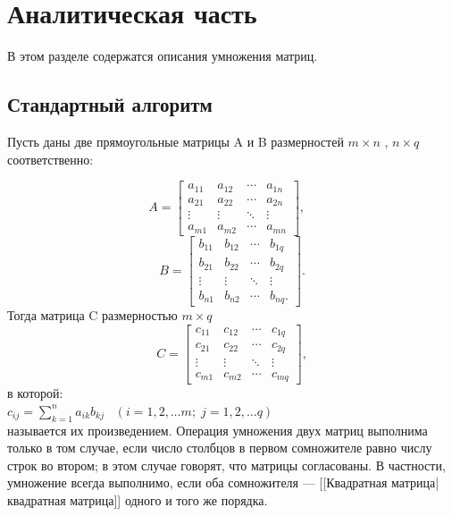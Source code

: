 \documentclass[a4paper,12pt]{report}
\begin{document}
\chapter{Аналитическая часть}
\hspace{0.6cm}В этом разделе содержатся описания умножения матриц.

\section{Стандартный алгоритм}
\hspace{0.6cm}Пусть даны две прямоугольные матрицы A и B размерностей $m \times n$ , $n \times q$ соответственно:

\[
A = 
  \begin{bmatrix} 
    a_{11} & a_{12} & \cdots & a_{1n} \\
    a_{21} & a_{22} & \cdots & a_{2n} \\ 
    \vdots & \vdots & \ddots & \vdots \\ 
    a_{m1} & a_{m2} & \cdots & a_{mn}
  \end{bmatrix},\;\;\;
\]
\[
B =   
  \begin{bmatrix} 
    b_{11} & b_{12} & \cdots & b_{1q} \\
    b_{21} & b_{22} & \cdots & b_{2q} \\ 
    \vdots & \vdots & \ddots & \vdots \\ 
    b_{n1} & b_{n2} & \cdots & b_{nq}.
  \end{bmatrix}.
\]
Тогда матрица C размерностью $m \times q$
\[
C = 
  \begin{bmatrix} 
    c_{11} & c_{12} & \cdots & c_{1q} \\
    c_{21} & c_{22} & \cdots & c_{2q} \\ 
    \vdots & \vdots & \ddots & \vdots \\ 
    c_{m1} & c_{m2} & \cdots & c_{mq}
  \end{bmatrix},
\]
в которой:\\

$c_{ij} = \sum_{k=1}^n a_{ik}b_{kj} \;\;\; \left(i=1, 2, \ldots m;\; j=1, 2, \ldots q \right)$\\

называется их произведением. Операция умножения двух матриц выполнима только в том случае, если число столбцов в первом сомножителе равно числу строк во втором; в этом случае говорят, что матрицы согласованы. В частности, умножение всегда выполнимо, если оба сомножителя — [[Квадратная матрица|квадратная матрица]] одного и того же порядка. 
\end{document}
